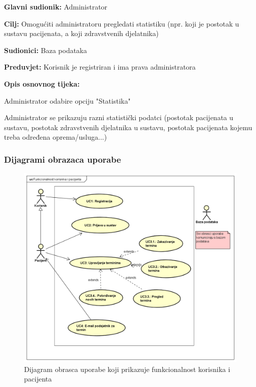 					\noindent {}
					\begin{packed_item}
						
						\item \textbf{Glavni sudionik: }Administrator
						\item  \textbf{Cilj:} Omogućiti administratoru pregledati statistiku (npr. koji je postotak u sustavu pacijenata, a koji zdravstvenih djelatnika)
						\item  \textbf{Sudionici:} Baza podataka
						\item  \textbf{Preduvjet:} Korisnik je registriran i ima prava administratora
						\item  \textbf{Opis osnovnog tijeka:}
						
						\item[] \begin{packed_enum}
							
							\item Administrator odabire opciju "Statistika"
							\item Administrator se prikazuju razni statistički podatci (postotak pacijenata u sustavu, postotak zdravstvenih djelatnika u sustavu, postotak pacijenata kojemu treba određena oprema/usluga...)
						\end{packed_enum}
						
					\end{packed_item}
										
				
					
				\subsubsection{Dijagrami obrazaca uporabe}
					
					\begin{figure}[H]
						\includegraphics[scale=0.6]{slike/KorisnikIPacijent.PNG} %
						\centering
						\caption{Dijagram obrasca uporabe koji prikazuje funkcionalnost korisnika i pacijenta}
						\label{fig:promjene}
					\end{figure}
					

